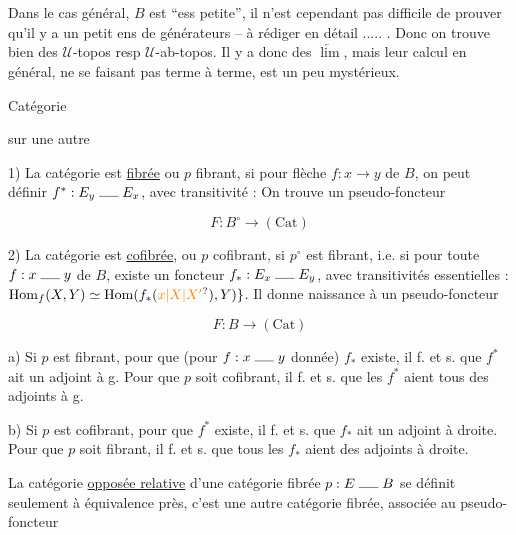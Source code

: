 Dans le cas général,  $B$ est  ``ess petite'',
il n'est cependant pas difficile de prouver
qu'il y a un petit ens de générateurs
-- à rédiger en détail ..... . Donc on
trouve bien des $\mathcal U$-topos resp $\mathcal U$-ab-topos.
Il y a donc des $\underleftarrow{\lim}$, mais leur
calcul en général, ne se faisant pas
terme à terme, est un peu mystérieux.



Catégorie


sur une autre

1) La catégorie est \uline{fibrée} ou $p$ fibrant, si pour  flèche $f:x\longrightarrow y$ de $B$, on peut définir $f^*:E_y\mathrel{\rule{1.4em}{.35pt}}E_x$, avec transitivité  :
On trouve un pseudo-foncteur

\[ F:B^\circ\longrightarrow(\mathrm{Cat}) \]

2) La catégorie est \uline{cofibrée}, ou $p$ cofibrant, si $p^\circ$ est fibrant, i.e. si pour toute $f:x\mathrel{\rule{1.4em}{.35pt}}y$ de $B$, existe un foncteur $f_*:E_x\mathrel{\rule{1.4em}{.35pt}}E_y$, avec transitivités essentielles : $\operatorname{Hom}_f(X,Y)\simeq\operatorname{Hom}(f_*(\unsure{x|X|X'}),Y)\rbrace$. Il donne naissance à un pseudo-foncteur

\[ F:B\longrightarrow(\mathrm{Cat}) \]

\uline{} a) Si $p$ est fibrant, pour que (pour $f:x\mathrel{\rule{1.4em}{.35pt}}y$ donnée) $f_*$ existe, il f. et s. que $f^*$ ait un adjoint à g. Pour que $p$ soit cofibrant, il f. et s. que les $f^*$ aient tous des adjoints à g.

b) Si $p$ est cofibrant, pour que $f^*$ existe, il f. et s. que $f_*$ ait un adjoint à droite. Pour que $p$ soit fibrant, il f. et s. que tous les $f_*$ aient des adjoints à droite.

La catégorie \uline{opposée relative} d'une catégorie fibrée $p:E\mathrel{\rule{1.4em}{.35pt}}B$ se définit seulement à équivalence près, c'est une autre catégorie fibrée, associée au pseudo-foncteur

